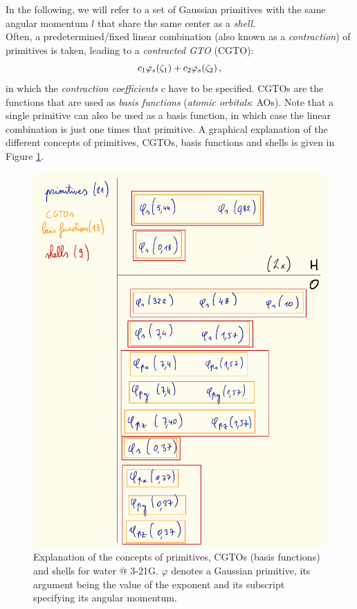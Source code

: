 \documentclass[12pt]{article}
\begin{document}
    In the following, we will refer to a set of Gaussian primitives with the same angular momentum $l$ that share the same center as a \textit{shell}. \\

    Often, a predetermined/fixed linear combination (also known as a \textit{contraction}) of primitives is taken, leading to a \textit{contracted GTO} (CGTO):
    \begin{equation}
        c_1 \varphi_s(\zeta_1) + c_2 \varphi_s(\zeta_2) \thinspace ,
    \end{equation}
    in which the \textit{contraction coefficients} $c$ have to be specified. CGTOs are the functions that are used as \textit{basis functions} (\textit{atomic orbitals}: AOs). Note that a single primitive can also be used as a basis function, in which case the linear combination is just one times that primitive. A graphical explanation of the different concepts of primitives, CGTOs, basis functions and shells is given in Figure \ref{fig:basis}. \\

    \begin{figure}[H]
        \centering
        \includegraphics[scale=0.65]{figures/H2O_3-21g}
        \caption{Explanation of the concepts of primitives, CGTOs (basis functions) and shells for water @ 3-21G. $\varphi$ denotes a Gaussian primitive, its argument being the value of the exponent and its subscript specifying its angular momentum.}
        \label{fig:basis}
    \end{figure}
\end{document}
